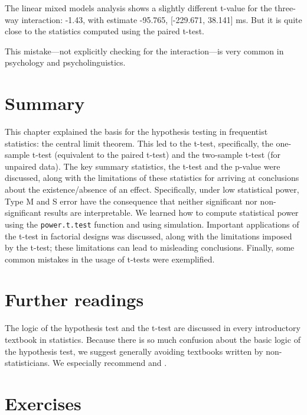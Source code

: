 \documentclass[
  12pt,
]{krantz}
\theoremstyle{definition}
\theoremstyle{definition}
\theoremstyle{definition}
\theoremstyle{definition}
\theoremstyle{remark}
\begin{document}
The linear mixed models analysis shows a slightly different t-value for the three-way interaction: -1.43, with estimate -95.765, {[}-229.671, 38.141{]} ms. But it is quite close to the statistics computed using the paired t-test.

This mistake---not explicitly checking for the interaction---is very common in psychology and psycholinguistics.

\hypertarget{summary-1}{%
\section{Summary}\label{summary-1}}

This chapter explained the basis for the hypothesis testing in frequentist statistics: the central limit theorem. This led to the t-test, specifically, the one-sample t-test (equivalent to the paired t-test) and the two-sample t-test (for unpaired data). The key summary statistics, the t-test and the p-value were discussed,
along with the limitations of these statistics for arriving at conclusions about the existence/absence of an effect. Specifically, under low statistical power, Type M and S error have the consequence that neither significant nor non-significant results are interpretable. We learned how to compute statistical power using the \texttt{power.t.test} function and using simulation. Important applications of the t-test in factorial designs was discussed, along with the limitations imposed by the t-test; these limitations can lead to misleading conclusions. Finally, some common mistakes in the usage of t-tests were exemplified.

\hypertarget{further-readings}{%
\section{Further readings}\label{further-readings}}

The logic of the hypothesis test and the t-test are discussed in every introductory textbook in statistics. Because there is so much confusion about the basic logic of the hypothesis test, we suggest generally avoiding textbooks written by non-statisticians. We especially recommend \citet{millermiller} and \citet{casellaberger}.

\hypertarget{sec:SamplingDistrnexercises}{%
\section{Exercises}\label{sec:SamplingDistrnexercises}}
\end{document}
